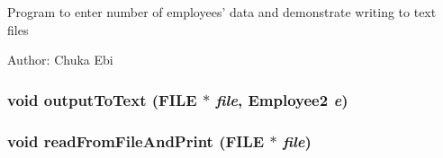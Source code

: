 Program to enter number of employees' data and demonstrate writing to text files \begin{Desc}
\item[Author:]Chuka Ebi \end{Desc}
\subsubsection{\setlength{\rightskip}{0pt plus 5cm}void output\-To\-Text (FILE $\ast$ {\em file}, \bf{Employee2} {\em e})}\label{p4_8c_b687547d29f0c5aede02dea2f5cc08f3}


\subsubsection{\setlength{\rightskip}{0pt plus 5cm}void read\-From\-File\-And\-Print (FILE $\ast$ {\em file})}\label{p4_8c_0ca2d781d6deb7f3675ac356ab172eb8}


